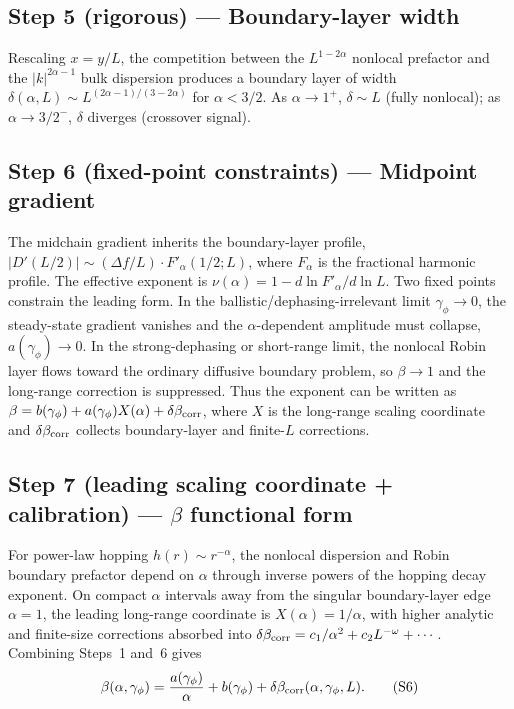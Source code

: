\documentclass[aps,prb,twocolumn,superscriptaddress]{revtex4-2}
\begin{document}
\subsection*{Step 5 (rigorous) --- Boundary-layer width}

Rescaling $x = y/L$, the competition between the $L^{1-2\alpha}$ nonlocal prefactor and the $|k|^{2\alpha-1}$ bulk dispersion produces a boundary layer of width $\delta(\alpha,L) \sim L^{(2\alpha-1)/(3-2\alpha)}$ for $\alpha < 3/2$. As $\alpha \to 1^+$, $\delta \sim L$ (fully nonlocal); as $\alpha \to 3/2^-$, $\delta$ diverges (crossover signal).

\subsection*{Step 6 (fixed-point constraints) --- Midpoint gradient}

The midchain gradient inherits the boundary-layer profile, $|D'(L/2)| \sim (\Delta f/L)\cdot F'_\alpha(1/2; L)$, where $F_\alpha$ is the fractional harmonic profile. The effective exponent is $\nu(\alpha) = 1 - d\ln F'_\alpha/d\ln L$. Two fixed points constrain the leading form. In the ballistic/dephasing-irrelevant limit $\gamma_\phi \to 0$, the steady-state gradient vanishes and the $\alpha$-dependent amplitude must collapse, $a(\gamma_\phi) \to 0$. In the strong-dephasing or short-range limit, the nonlocal Robin layer flows toward the ordinary diffusive boundary problem, so $\beta \to 1$ and the long-range correction is suppressed. Thus the exponent can be written as $\beta = b(\gamma_\phi) + a(\gamma_\phi)X(\alpha) + \delta\beta_{\rm corr}$, where $X$ is the long-range scaling coordinate and $\delta\beta_{\rm corr}$ collects boundary-layer and finite-$L$ corrections.

\subsection*{Step 7 (leading scaling coordinate + calibration) --- $\beta$ functional form}

For power-law hopping $h(r) \sim r^{-\alpha}$, the nonlocal dispersion and Robin boundary prefactor depend on $\alpha$ through inverse powers of the hopping decay exponent. On compact $\alpha$ intervals away from the singular boundary-layer edge $\alpha = 1$, the leading long-range coordinate is $X(\alpha) = 1/\alpha$, with higher analytic and finite-size corrections absorbed into $\delta\beta_{\rm corr} = c_1/\alpha^2 + c_2 L^{-\omega} + \cdots$. Combining Steps~1 and~6 gives
\begin{equation}
\beta(\alpha,\gamma_\phi) = \frac{a(\gamma_\phi)}{\alpha} + b(\gamma_\phi) + \delta\beta_{\rm corr}(\alpha,\gamma_\phi,L).
\tag{S6}
\end{equation}
\end{document}
